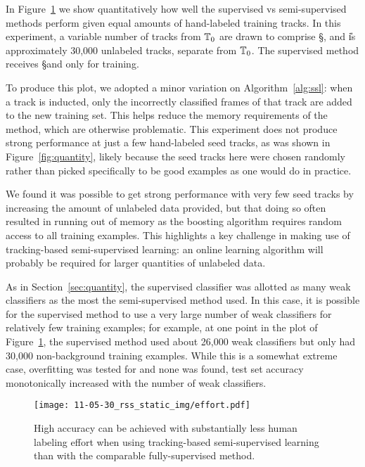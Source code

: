 \documentclass[conference]{IEEEtran}
\begin{document}
In Figure~\ref{fig:effort} we show quantitatively how well the supervised vs semi-supervised methods perform given equal amounts of hand-labeled training tracks.  In this experiment, a variable number of tracks from $\mathbb{T}_0$ are drawn to comprise \S, and \U is approximately 30,000 unlabeled tracks, separate from $\mathbb{T}_0$.  The supervised method receives \S and \B only for training.

To produce this plot, we adopted a minor variation on Algorithm~\ref{alg:ssl}: when a track is inducted, only the incorrectly classified frames of that track are added to the new training set.  This helps reduce the memory requirements of the method, which are otherwise problematic.  This experiment does not produce strong performance at just a few hand-labeled seed tracks, as was shown in Figure~\ref{fig:quantity}, likely because the seed tracks here were chosen randomly rather than picked specifically to be good examples as one would do in practice.

We found it was possible to get strong performance with very few seed tracks by increasing the amount of unlabeled data provided, but that doing so often resulted in running out of memory as the boosting algorithm requires random access to all training examples.  This highlights a key challenge in making use of tracking-based semi-supervised learning: an online learning algorithm will probably be required for larger quantities of unlabeled data.

As in Section~\ref{sec:quantity}, the supervised classifier was allotted as many weak classifiers as the most the semi-supervised method used.  In this case, it is possible for the supervised method to use a very large number of weak classifiers for relatively few training examples; for example, at one point in the plot of Figure~\ref{fig:effort}, the supervised method used about 26,000 weak classifiers but only had 30,000 non-background training examples.  While this is a somewhat extreme case, overfitting was tested for and none was found, \ie test set accuracy monotonically increased with the number of weak classifiers.


\begin{figure}
  \centering
  \texttt{[image: 11-05-30\_rss\_static\_img/effort.pdf]}
  \caption{High accuracy can be achieved with substantially less human labeling effort when using tracking-based semi-supervised learning than with the comparable fully-supervised method.}
  \label{fig:effort}
\end{figure}
\end{document}
